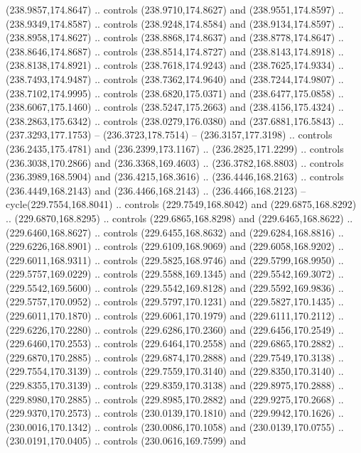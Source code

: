\begin{scope}[cm={{1.25,0.0,0.0,-1.25,(0.0,442.91375)}}]
    (238.9857,174.8647) .. controls (238.9710,174.8627) and (238.9551,174.8597) ..
    (238.9349,174.8587) .. controls (238.9248,174.8584) and (238.9134,174.8597) ..
    (238.8958,174.8627) .. controls (238.8868,174.8637) and (238.8778,174.8647) ..
    (238.8646,174.8687) .. controls (238.8514,174.8727) and (238.8143,174.8918) ..
    (238.8138,174.8921) .. controls (238.7618,174.9243) and (238.7625,174.9334) ..
    (238.7493,174.9487) .. controls (238.7362,174.9640) and (238.7244,174.9807) ..
    (238.7102,174.9995) .. controls (238.6820,175.0371) and (238.6477,175.0858) ..
    (238.6067,175.1460) .. controls (238.5247,175.2663) and (238.4156,175.4324) ..
    (238.2863,175.6342) .. controls (238.0279,176.0380) and (237.6881,176.5843) ..
    (237.3293,177.1753) -- (236.3723,178.7514) -- (236.3157,177.3198) .. controls
    (236.2435,175.4781) and (236.2399,173.1167) .. (236.2825,171.2299) .. controls
    (236.3038,170.2866) and (236.3368,169.4603) .. (236.3782,168.8803) .. controls
    (236.3989,168.5904) and (236.4215,168.3616) .. (236.4446,168.2163) .. controls
    (236.4449,168.2143) and (236.4466,168.2143) .. (236.4466,168.2123) --
    cycle(229.7554,168.8041) .. controls (229.7549,168.8042) and
    (229.6875,168.8292) .. (229.6870,168.8295) .. controls (229.6865,168.8298) and
    (229.6465,168.8622) .. (229.6460,168.8627) .. controls (229.6455,168.8632) and
    (229.6284,168.8816) .. (229.6226,168.8901) .. controls (229.6109,168.9069) and
    (229.6058,168.9202) .. (229.6011,168.9311) .. controls (229.5825,168.9746) and
    (229.5799,168.9950) .. (229.5757,169.0229) .. controls (229.5588,169.1345) and
    (229.5542,169.3072) .. (229.5542,169.5600) .. controls (229.5542,169.8128) and
    (229.5592,169.9836) .. (229.5757,170.0952) .. controls (229.5797,170.1231) and
    (229.5827,170.1435) .. (229.6011,170.1870) .. controls (229.6061,170.1979) and
    (229.6111,170.2112) .. (229.6226,170.2280) .. controls (229.6286,170.2360) and
    (229.6456,170.2549) .. (229.6460,170.2553) .. controls (229.6464,170.2558) and
    (229.6865,170.2882) .. (229.6870,170.2885) .. controls (229.6874,170.2888) and
    (229.7549,170.3138) .. (229.7554,170.3139) .. controls (229.7559,170.3140) and
    (229.8350,170.3140) .. (229.8355,170.3139) .. controls (229.8359,170.3138) and
    (229.8975,170.2888) .. (229.8980,170.2885) .. controls (229.8985,170.2882) and
    (229.9275,170.2668) .. (229.9370,170.2573) .. controls (230.0139,170.1810) and
    (229.9942,170.1626) .. (230.0016,170.1342) .. controls (230.0086,170.1058) and
    (230.0139,170.0755) .. (230.0191,170.0405) .. controls (230.0616,169.7599) and

\end{scope}
